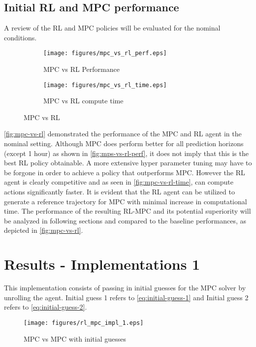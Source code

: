 \subsection{Initial RL and MPC performance}
A review of the RL and MPC policies will be evaluated for the nominal conditions.

\begin{figure}[H]
	\centering
	\begin{subfigure}[b]{0.49\textwidth}
		\centering
		\texttt{[image: figures/mpc\_vs\_rl\_perf.eps]}
		\caption{MPC vs RL Performance}
		\label{fig:mps-vs-rl-perf}
	\end{subfigure}
	\hfill
	\begin{subfigure}[b]{0.49\textwidth}
		\centering
		\texttt{[image: figures/mpc\_vs\_rl\_time.eps]}
		\caption{MPC vs RL compute time}
		\label{fig:mpc-vs-rl-time}
	\end{subfigure}
	\caption{MPC vs RL}
	\label{fig:mpc-vs-rl}
\end{figure}

\autoref{fig:mpc-vs-rl} demonstrated the performance of the MPC and RL agent in the nominal setting. Although MPC does perform better for all prediction horizons (except 1 hour) as shown in \autoref{fig:mps-vs-rl-perf}, it does not imply that this is the best RL policy obtainable. A more extensive hyper parameter tuning may have to be forgone in order to achieve a policy that outperforms MPC. However the RL agent is clearly competitive and as seen in \autoref{fig:mpc-vs-rl-time}, can compute actions significantly faster. It is evident that the RL agent can be utilized to generate a reference trajectory for MPC with minimal increase in computational time. The performance of the resulting RL-MPC and its potential superiority will be analyzed in following sections and compared to the baseline performances, as depicted in \autoref{fig:mpc-vs-rl}.

\section{Results - Implementations 1}
This implementation consists of passing in initial guesses for the MPC solver by unrolling the agent. Initial guess 1 refers to \autoref{eq:initial-guess-1} and Initial guess 2 refers to \autoref{eq:initial-guess-2}.
\begin{figure}[H]
	\centering
	\texttt{[image: figures/rl\_mpc\_impl\_1.eps]}
	\caption{MPC vs MPC with initial guesses}
	\label{fig:rlmpc-impl1}
\end{figure}

